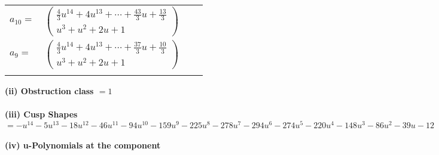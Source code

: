 \documentclass[1p]{elsarticle_modified}
\theoremstyle{definition}
\begin{document}
\begin{tabular}{m{7pt} m{180pt} m{7pt} m{180pt} }
\flushright $a_{10}=$&$\begin{pmatrix}\frac{4}{3} u^{14}+4 u^{13}+\cdots+\frac{43}{3} u+\frac{13}{3}\\u^3+u^2+2 u+1\end{pmatrix}$ \\
\flushright $a_{9}=$&$\begin{pmatrix}\frac{4}{3} u^{14}+4 u^{13}+\cdots+\frac{37}{3} u+\frac{10}{3}\\u^3+u^2+2 u+1\end{pmatrix}$\\&\end{tabular}
\flushleft \textbf{(ii) Obstruction class $= 1$}\\~\\
\flushleft \textbf{(iii) Cusp Shapes $= - u^{14}-5 u^{13}-18 u^{12}-46 u^{11}-94 u^{10}-159 u^9-225 u^8-278 u^7-294 u^6-274 u^5-220 u^4-148 u^3-86 u^2-39 u-12$}\\~\\
\newpage\renewcommand{\arraystretch}{1}
\flushleft \textbf{(iv) u-Polynomials at the component}\newline \\
\end{document}
